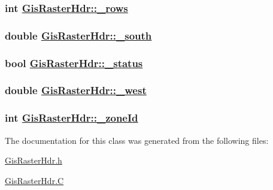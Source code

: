 \hypertarget{classGisRasterHdr_p7}{
\subsubsection[\_\-rows]{\setlength{\rightskip}{0pt plus 5cm}int \hyperlink{classGisRasterHdr_p7}{Gis\-Raster\-Hdr::\_\-rows}}}
\label{classGisRasterHdr_p7}


\hypertarget{classGisRasterHdr_p3}{
\subsubsection[\_\-south]{\setlength{\rightskip}{0pt plus 5cm}double \hyperlink{classGisRasterHdr_p3}{Gis\-Raster\-Hdr::\_\-south}}}
\label{classGisRasterHdr_p3}


\hypertarget{classGisRasterHdr_p12}{
\subsubsection[\_\-status]{\setlength{\rightskip}{0pt plus 5cm}bool \hyperlink{classGisRasterHdr_p12}{Gis\-Raster\-Hdr::\_\-status}}}
\label{classGisRasterHdr_p12}


\hypertarget{classGisRasterHdr_p5}{
\subsubsection[\_\-west]{\setlength{\rightskip}{0pt plus 5cm}double \hyperlink{classGisRasterHdr_p5}{Gis\-Raster\-Hdr::\_\-west}}}
\label{classGisRasterHdr_p5}


\hypertarget{classGisRasterHdr_p1}{
\subsubsection[\_\-zoneId]{\setlength{\rightskip}{0pt plus 5cm}int \hyperlink{classGisRasterHdr_p1}{Gis\-Raster\-Hdr::\_\-zone\-Id}}}
\label{classGisRasterHdr_p1}




The documentation for this class was generated from the following files:\begin{CompactItemize}
\item 
\hyperlink{GisRasterHdr_8h}{Gis\-Raster\-Hdr.h}\item 
\hyperlink{GisRasterHdr_8C}{Gis\-Raster\-Hdr.C}\end{CompactItemize}
